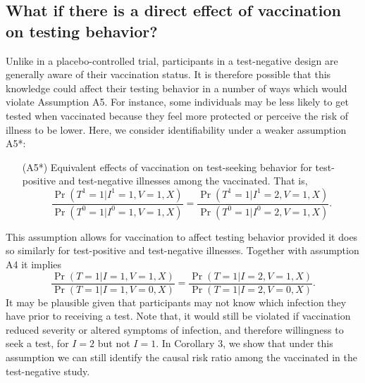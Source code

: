 \begin{appendix}
\subsection{What if there is a direct effect of vaccination on testing behavior?}
Unlike in a placebo-controlled trial, participants in a test-negative design are generally aware of their vaccination status. It is therefore possible that this knowledge could affect their testing behavior in a number of ways which would violate Assumption A5. For instance, some individuals may be less likely to get tested when vaccinated because they feel more protected or perceive the risk of illness to be lower. Here, we consider identifiability under a weaker assumption A5*:
\begin{itemize}
    \item[(A5*)] Equivalent effects of vaccination on test-seeking behavior for test-positive and test-negative illnesses among the vaccinated. That is, 
    \begin{equation}
    \dfrac{\Pr(T^1 = 1 | I^1 = 1, V = 1, X)}{\Pr(T^0 = 1 | I^0 = 1, V = 1, X)} = \dfrac{\Pr(T^1 = 1 | I^1 = 2, V = 1, X)}{\Pr(T^0 = 1 | I^0 = 2, V = 1, X)}.
\end{equation}
\end{itemize}
This assumption allows for vaccination to affect testing behavior provided it does so similarly for test-positive and test-negative illnesses. Together with assumption A4 it implies
\begin{equation*}
    \dfrac{\Pr(T = 1 | I = 1, V = 1, X)}{\Pr(T = 1 | I = 1, V = 0, X)} = \dfrac{\Pr(T = 1 | I = 2, V = 1, X)}{\Pr(T = 1 | I = 2, V = 0, X)}.
\end{equation*}
It may be plausible given that participants may not know which infection they have prior to receiving a test. Note that, it would still be violated if vaccination reduced severity or altered symptoms of infection, and therefore willingness to seek a test, for $I=2$ but not $I=1$. In Corollary 3, we show that under this assumption we can still identify the causal risk ratio among the vaccinated in the test-negative study. 
\vspace{1em}




\end{appendix}
